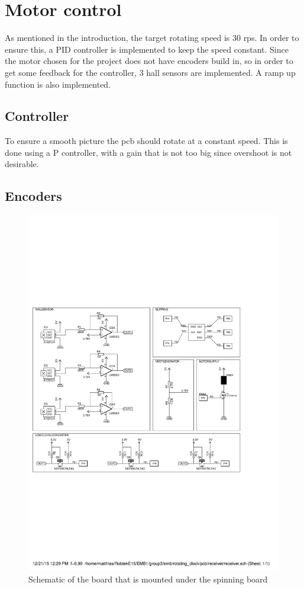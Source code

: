 \section{Motor control}
As mentioned in the introduction, the target rotating speed is 30 rps.
In order to ensure this, a PID controller is implemented to keep the speed constant.
Since the motor chosen for the project does not have encoders build in, so in order to get some feedback for the controller, 3 hall sensors are implemented.
A ramp up function is also implemented.

\subsection{Controller}

To ensure a smooth picture the pcb should rotate at a constant speed.
This is done using a P controller, with a gain that is not too big since overshoot is not desirable.

\subsection{Encoders} \label{sec:encoders}
\begin{figure}
 \caption{Schematic of the board that is mounted under the spinning board}
 \label{fig:botm_schematic}
 \centering
 \includegraphics[scale = 0.5,trim = 0 14.5cm 8cm 0,clip = true]{img/bottompcb_schematic}
\end{figure}

